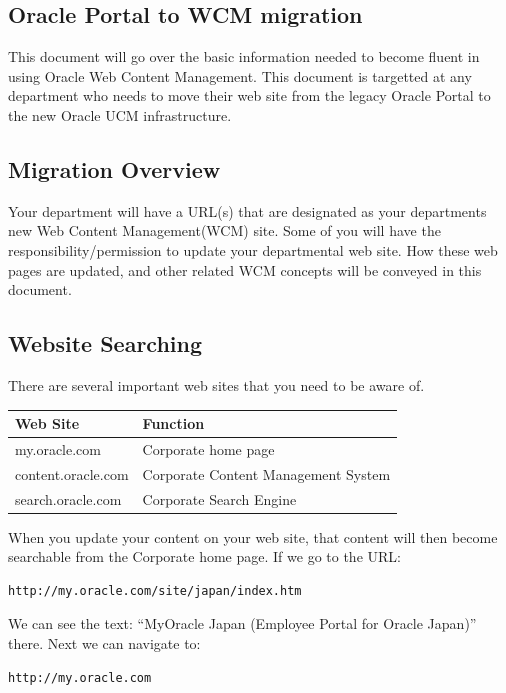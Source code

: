 \subsection{Oracle Portal to WCM migration}

This document will go over the basic information needed to become
fluent in using Oracle Web Content Management.  This document is
targetted at any department who needs to move their web site from the
legacy Oracle Portal to the new Oracle UCM infrastructure.

\subsection{Migration Overview}

Your department will have a URL(s) that are designated as your
departments new Web Content Management(WCM) site.  Some of you will
have the responsibility/permission to update your departmental web
site.  How these web pages are updated, and other related WCM concepts
will be conveyed in this document.

\subsection{Website Searching}
 
There are several important web sites that you need to be aware of.

\begin{tabular}{|l l|} 
\hline
Web Site           & Function \\
\hline 
my.oracle.com      & Corporate home page \\ 
content.oracle.com & Corporate Content Management System \\ 
search.oracle.com  & Corporate Search Engine \\
\hline
\end{tabular}


When you update your content on your web site, that content will then
become searchable from the Corporate home page.  If we go to the URL:

\begin{verbatim}
http://my.oracle.com/site/japan/index.htm
\end{verbatim}

We can see the text: ``MyOracle Japan (Employee Portal for Oracle
Japan)'' there.  Next we can navigate to:

\begin{verbatim}
http://my.oracle.com
\end{verbatim}

